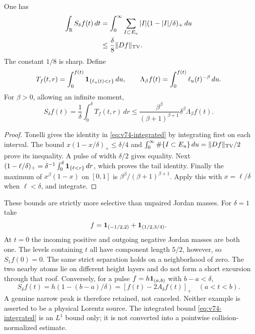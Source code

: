 \begin{proposition}
\label{prop:v74-integrated}
One has
\begin{align}
 \int_\R S_\delta f(t)\,dt
 &=\int_0^\infty\sum_{I\subset E_u}
                         |I|(1-|I|/\delta)_+\,du\notag\\
 &\le\frac{\delta}{8}\|Df\|_{\TV}.\label{eq:v74-integrated}
\end{align}
The constant $1/8$ is sharp. Define
\[
 T_f(t,r)=\int_0^{f(t)}\mathbf1_{\{\ell_u(t)<r\}}\,du,
 \qquad
 \Lambda_\beta f(t)=\int_0^{f(t)}\ell_u(t)^{-\beta}\,du.
\]
For $\beta>0$, allowing an infinite moment,
\begin{equation}\label{eq:v74-tail-moment}
 S_\delta f(t)=\frac1\delta\int_0^\delta T_f(t,r)\,dr
 \le\frac{\beta^\beta}{(\beta+1)^{\beta+1}}
                              \delta^\beta\Lambda_\beta f(t).
\end{equation}
\end{proposition}
\begin{proof}
Tonelli gives the identity in \eqref{eq:v74-integrated} by integrating
first on each interval. The bound $x(1-x/\delta)_+\le\delta/4$
and $\int_0^\infty\#\{I\subset E_u\}\,du=\|Df\|_{\operatorname{TV}}/2$
prove its inequality. A pulse of width $\delta/2$ gives equality.
Next $(1-\ell/\delta)_+=\delta^{-1}\int_0^\delta
\mathbf1_{\{\ell<r\}}\,dr$, which proves the tail identity.
Finally the maximum of $x^\beta(1-x)$ on $[0,1]$ is
$\beta^\beta/(\beta+1)^{\beta+1}$. Apply this with $x=\ell/\delta$
when $\ell<\delta$, and integrate.
\end{proof}

These bounds are strictly more selective than unpaired Jordan masses.
For $\delta=1$ take
\[
 f=\mathbf1_{(-1/2,2)}+\mathbf1_{(1/2,3/4)}.
\]
At $t=0$ the incoming positive and outgoing negative Jordan masses
are both one. The levels containing $t$ all have component length
$5/2$, however, so $S_1f(0)=0$. The same strict separation holds
on a neighborhood of zero. The two nearby atoms lie on different
height layers and do not form a short excursion through that roof.
Conversely, for a pulse $f=h\mathbf1_{(a,b)}$ with $b-a<\delta$,
\[
 S_\delta f(t)=h(1-(b-a)/\delta)
             =[f(t)-2A_\delta f(t)]_+\quad(a<t<b).
\]
A genuine narrow peak is therefore retained, not canceled. Neither
example is asserted to be a physical Lorentz source. The integrated
bound \eqref{eq:v74-integrated} is an $L^1$ bound only; it is not
converted into a pointwise collision-normalized estimate.
